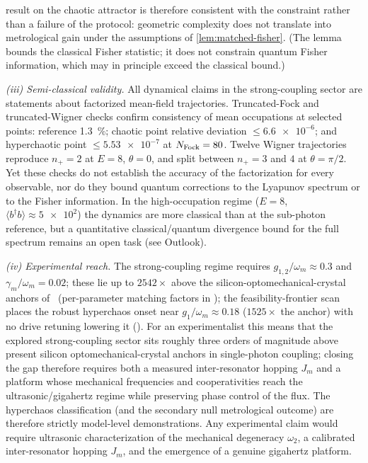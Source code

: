 \documentclass[preprint,numbers,a4paper]{elsarticle}
\begin{document}
result on the chaotic attractor is therefore consistent with the constraint rather than a failure of the protocol: geometric complexity does not translate into metrological gain under the assumptions of \cref{lem:matched-fisher}. (The lemma bounds the classical Fisher statistic; it does not constrain quantum Fisher information, which may in principle exceed the classical bound.)

\emph{(iii) Semi-classical validity.} All dynamical claims in the strong-coupling sector are statements about factorized mean-field trajectories. Truncated-Fock and truncated-Wigner checks confirm consistency of mean occupations at selected points: reference \qty{1.3}{\percent}; chaotic point relative deviation $\le\num{6.6e-6}$; and hyperchaotic point $\le\num{5.53e-7}$ at $N_{\rm Fock}=\num{80}$. Twelve Wigner trajectories reproduce $n_+=2$ at $E=\num{8}$, $\theta=\num{0}$, and split between $n_+=3$ and $4$ at $\theta=\pi/2$. Yet these checks do not establish the accuracy of the factorization for every observable, nor do they bound quantum corrections to the Lyapunov spectrum or to the Fisher information. In the high-occupation regime ($E=\num{8}$, $\langle b^\dagger b\rangle\approx\num{5e2}$) the dynamics are more classical than at the sub-photon reference, but a quantitative classical/quantum divergence bound for the full spectrum remains an open task (see Outlook).

\emph{(iv) Experimental reach.} The strong-coupling regime requires $g_{1,2}/\omega_m\approx\num{0.3}$ and $\gamma_m/\omega_m=\num{0.02}$; these lie up to $\num{2542}\times$ above the silicon-optomechanical-crystal anchors of~\cite{Mayor2025,Mathew2020} (per-parameter matching factors in ); the feasibility-frontier scan places the robust hyperchaos onset near $g_1/\omega_m\approx\num{0.18}$ ($\num{1525}\times$ the anchor) with no drive retuning lowering it (). For an experimentalist this means that the explored strong-coupling sector sits roughly three orders of magnitude above present silicon optomechanical-crystal anchors in single-photon coupling; closing the gap therefore requires both a measured inter-resonator hopping $J_m$ and a platform whose mechanical frequencies and cooperativities reach the ultrasonic/gigahertz regime while preserving phase control of the flux. The hyperchaos classification (and the secondary null metrological outcome) are therefore strictly model-level demonstrations. Any experimental claim would require ultrasonic characterization of the mechanical degeneracy $\omega_2$, a calibrated inter-resonator hopping $J_m$, and the emergence of a genuine gigahertz platform.
\end{document}
